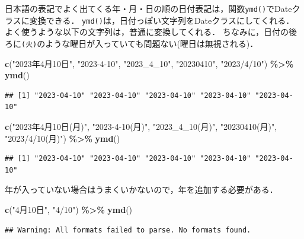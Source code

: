 \documentclass[
]{article}
\newenvironment{Shaded}{\begin{snugshade}}{\end{snugshade}}
\newcommand{\FunctionTok}[1]{\textcolor[rgb]{0.13,0.29,0.53}{\textbf{#1}}}
\newcommand{\NormalTok}[1]{#1}
\newcommand{\SpecialCharTok}[1]{\textcolor[rgb]{0.81,0.36,0.00}{\textbf{#1}}}
\newcommand{\StringTok}[1]{\textcolor[rgb]{0.31,0.60,0.02}{#1}}
\begin{document}
日本語の表記でよく出てくる年・月・日の順の日付表記は，関数\texttt{ymd()}でDateクラスに変換できる．
\texttt{ymd()}は，日付っぽい文字列をDateクラスにしてくれる．
よく使うような以下の文字列は，普通に変換してくれる．
ちなみに，日付の後ろに\texttt{(火)}のような曜日が入っていても問題ない(曜日は無視される)．

\begin{Shaded}
\begin{Highlighting}[]
\FunctionTok{c}\NormalTok{(}\StringTok{"2023年4月10日"}\NormalTok{, }\StringTok{"2023{-}4{-}10"}\NormalTok{, }\StringTok{"2023\_4\_10"}\NormalTok{, }\StringTok{"20230410"}\NormalTok{, }\StringTok{"2023/4/10"}\NormalTok{) }\SpecialCharTok{\%\textgreater{}\%}
  \FunctionTok{ymd}\NormalTok{()}
\end{Highlighting}
\end{Shaded}

\begin{verbatim}
## [1] "2023-04-10" "2023-04-10" "2023-04-10" "2023-04-10" "2023-04-10"
\end{verbatim}

\begin{Shaded}
\begin{Highlighting}[]
\FunctionTok{c}\NormalTok{(}\StringTok{"2023年4月10日(月)"}\NormalTok{, }\StringTok{"2023{-}4{-}10(月)"}\NormalTok{, }\StringTok{"2023\_4\_10(月)"}\NormalTok{, }\StringTok{"20230410(月)"}\NormalTok{, }\StringTok{"2023/4/10(月)"}\NormalTok{) }\SpecialCharTok{\%\textgreater{}\%}
  \FunctionTok{ymd}\NormalTok{()}
\end{Highlighting}
\end{Shaded}

\begin{verbatim}
## [1] "2023-04-10" "2023-04-10" "2023-04-10" "2023-04-10" "2023-04-10"
\end{verbatim}

年が入っていない場合はうまくいかないので，年を追加する必要がある．

\begin{Shaded}
\begin{Highlighting}[]
\FunctionTok{c}\NormalTok{(}\StringTok{"4月10日"}\NormalTok{, }\StringTok{"4/10"}\NormalTok{) }\SpecialCharTok{\%\textgreater{}\%}
  \FunctionTok{ymd}\NormalTok{()}
\end{Highlighting}
\end{Shaded}

\begin{verbatim}
## Warning: All formats failed to parse. No formats found.
\end{verbatim}
\end{document}
